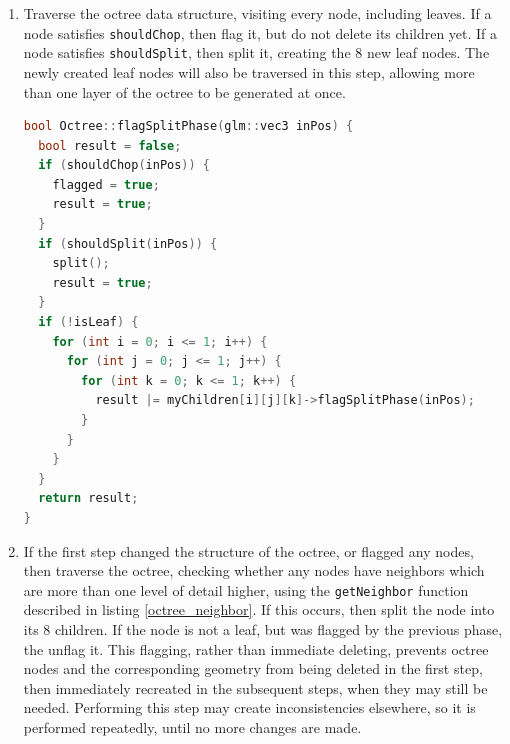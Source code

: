 \documentclass[11pt]{article}
\begin{document}
\begin{enumerate}
  \item Traverse the octree data structure, visiting every node, including leaves. If a node satisfies \texttt{shouldChop}, then flag it, but do not delete its children yet. If a node satisfies \texttt{shouldSplit}, then split it, creating the 8 new leaf nodes. The newly created leaf nodes will also be traversed in this step, allowing more than one layer of the octree to be generated at once.
  
  \begin{lstlisting}[language=C++,label={flagsplitphase},caption={The first stage in the octree refinement process, \texttt{flagSplitPhase}}]
bool Octree::flagSplitPhase(glm::vec3 inPos) {
  bool result = false;
  if (shouldChop(inPos)) {
    flagged = true;
    result = true;
  } 
  if (shouldSplit(inPos)) {
    split();
    result = true;
  }
  if (!isLeaf) {
    for (int i = 0; i <= 1; i++) {
      for (int j = 0; j <= 1; j++) {
        for (int k = 0; k <= 1; k++) {
          result |= myChildren[i][j][k]->flagSplitPhase(inPos);
        }
      }
    }
  }
  return result;
}
  \end{lstlisting}
  \item  If the first step changed the structure of the octree, or flagged any nodes, then traverse the octree, checking whether any nodes have neighbors which are more than one level of detail higher, using the \texttt{getNeighbor} function described in listing \ref{octree_neighbor}. If this occurs, then split the node into its 8 children. If the node is not a leaf, but was flagged by the previous phase, the unflag it. This flagging, rather than immediate deleting, prevents octree nodes and the corresponding geometry from being deleted in the first step, then immediately recreated in the subsequent steps, when they may still be needed. Performing this step may create inconsistencies elsewhere, so it is performed repeatedly, until no more changes are made.


\end{enumerate}
\end{document}
